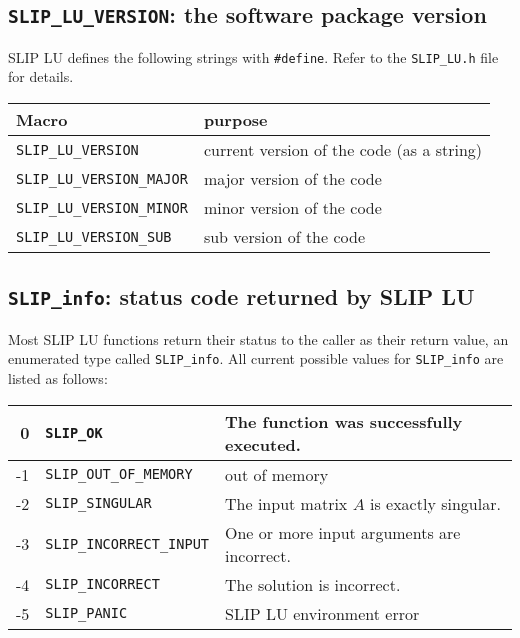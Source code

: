 \documentclass[12pt]{article}
\theoremstyle{definition}
\begin{document}
\cprotect\subsection{\verb|SLIP_LU_VERSION|: the software package version}

SLIP LU defines the following strings with \verb|#define|. Refer to
the \verb|SLIP_LU.h| file for details.

\begin{center}
\begin{tabular}{ll}
\hline
Macro & purpose \\
\hline
\verb|SLIP_LU_VERSION|       & current version of the code (as a string)\\
\verb|SLIP_LU_VERSION_MAJOR| & major version of the code\\
\verb|SLIP_LU_VERSION_MINOR| & minor version of the code   \\
\verb|SLIP_LU_VERSION_SUB|   & sub version of the code\\
\hline
\end{tabular}
\end{center}

\cprotect\subsection{\verb|SLIP_info|: status code returned by SLIP LU}
\label{ss:SLIP_info}

Most SLIP LU functions return their status to the caller as their return value,
an enumerated type called \verb|SLIP_info|. All current possible values for
\verb|SLIP_info| are listed as follows:

\begin{center}
\begin{tabular}{rll}
\hline
    0& \verb|SLIP_OK|& The function was successfully executed.\\
\hline
    -1& \verb|SLIP_OUT_OF_MEMORY|& out of memory\\
\hline
    -2& \verb|SLIP_SINGULAR|& The input matrix $A$ is exactly singular.\\
\hline
    -3& \verb|SLIP_INCORRECT_INPUT|& One or more input arguments are incorrect.\\
\hline
    -4& \verb|SLIP_INCORRECT|& The solution is incorrect.\\
\hline
    -5& \verb|SLIP_PANIC| & SLIP LU environment error \\
\hline
\end{tabular}
\end{center}
\end{document}
